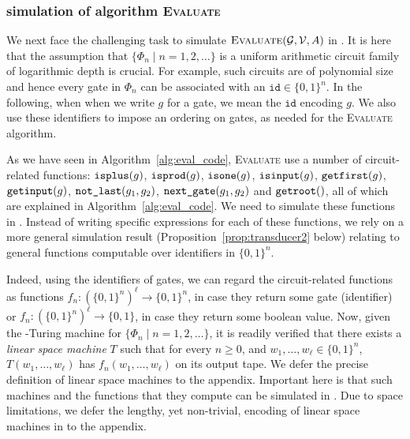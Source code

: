  




\subsubsection{\langfor simulation of algorithm {\normalfont \textsc{Evaluate}}}\label{subsubsec:simulate}
We next face the challenging task to simulate $\textsc{Evaluate}(\mathcal{G},\mathcal{V},A)$ in \langfor. It is here that the
assumption that  $\{\Phi_n\mid n=1,2,\ldots\}$ is a uniform arithmetic circuit family of logarithmic depth is crucial.
For example, such circuits are of polynomial size and hence every gate in $\Phi_n$ can be associated with an $\texttt{id}\in\lbrace 0,1 \rbrace^n$. In the following, when when we write $g$ for a gate, we mean the $\texttt{id}$ encoding $g$. We also use these identifiers to impose an
ordering on gates, as needed for the \textsc{Evaluate} algorithm. 


As we have seen in Algorithm~\ref{alg:eval_code}, \textsc{Evaluate} use a number of circuit-related functions:
$\texttt{isplus}(g)$, $\texttt{isprod}(g)$, $\texttt{isone}(g)$, $\texttt{isinput}(g)$, $\texttt{getfirst}(g)$, $\texttt{getinput}(g)$, $\texttt{not{\_}last}(g_1,g_2)$,
\allowbreak $\texttt{next{\_}gate}(g_1, g_2)$ and $\texttt{getroot}()$, all of which are explained in Algorithm~\ref{alg:eval_code}. 
We need to simulate these functions in \langfor. Instead of writing specific \langfor expressions for each of these
functions, we rely on a more general simulation result (Proposition~\ref{prop:transducer2} below) relating to general
functions computable over identifiers in $\{0,1\}^n$.

Indeed, using the identifiers of gates, we can regard the circuit-related functions as functions $f_n:(\lbrace 0,1 \rbrace^{n})^\ell\rightarrow\lbrace 0,1 \rbrace^n$, in case they return some gate (identifier) or $f_n:(\lbrace 0,1 \rbrace^{n})^\ell\rightarrow\lbrace 0,1 \rbrace$,
in case they return some boolean value. Now, given the \logspace-Turing machine for $\{\Phi_n\mid n=1,2,\ldots\}$, it is readily verified that there exists a \textit{linear
space machine} $T$ such that for every $n\geq 0$, and $w_1,\ldots,w_\ell\in\{0,1\}^n$, $T(w_1,\ldots,w_\ell)$ has $f_n(w_1,\ldots,w_\ell)$ on its output tape. We defer the precise definition of linear space machines to the appendix.
Important here is that such machines and the functions that they compute  can be simulated in \langfor. Due to space limitations, we defer the lengthy, yet non-trivial, encoding of linear space machines in \langfor to the appendix.

